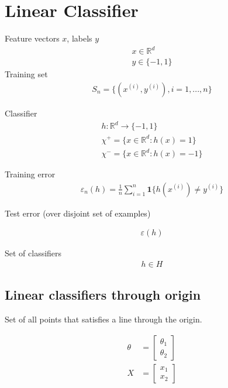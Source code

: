 \section{Linear Classifier}
Feature vectors $x$, labels $y$
\begin{align*}
x \in \mathbb{R}^d\\
y \in \{-1,1\}
\end{align*}
Training set
\begin{align*}
S_n = \{(x^{(i)}, y^{(i)}), i=1,...,n\}
\end{align*}

Classifier
\begin{align*}
h: \mathbb{R}^d \rightarrow \{-1,1\}\\
\chi^{+} = \{x \in \mathbb{R}^d: h(x) =1\}\\
\chi^{-} = \{x \in \mathbb{R}^d: h(x) =-1\}
\end{align*}

Training error
\begin{align*}
\varepsilon_n(h)= \frac{1}{n} \sum_{i=1}^n \textbf{1}\{h(x^{(i)}) \neq y^{(i)} \}
\end{align*}

Test error (over disjoint set of examples)

\begin{align*}
\varepsilon(h)
\end{align*}

Set of classifiers
\begin{align*}
h \in H
\end{align*}

\subsection{Linear classifiers through origin}

Set of all points that satisfies a line through the origin.

\begin{align*}
\theta &= \begin{bmatrix}
           \theta_{1} \\
           \theta_{2}
         \end{bmatrix}\\
X &= \begin{bmatrix}
           x_{1} \\
           x_{2}
         \end{bmatrix}\\
\end{align*}

